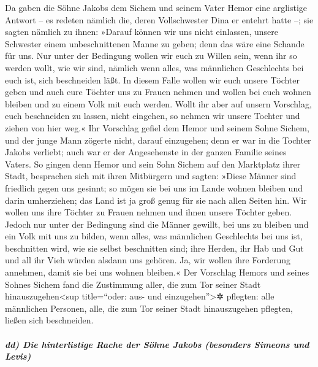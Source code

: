  Da gaben die Söhne Jakobs dem Sichem und seinem Vater
Hemor eine arglistige Antwort -- es redeten nämlich die, deren
Vollschwester Dina er entehrt hatte --;  sie sagten
nämlich zu ihnen: »Darauf können wir uns nicht einlassen, unsere
Schwester einem unbeschnittenen Manne zu geben; denn das wäre eine
Schande für uns.  Nur unter der Bedingung wollen wir euch
zu Willen sein, wenn ihr so werden wollt, wie wir sind, nämlich wenn
alles, was männlichen Geschlechts bei euch ist, sich beschneiden läßt.
 In diesem Falle wollen wir euch unsere Töchter geben und
auch eure Töchter uns zu Frauen nehmen und wollen bei euch wohnen
bleiben und zu einem Volk mit euch werden.  Wollt ihr
aber auf unsern Vorschlag, euch beschneiden zu lassen, nicht eingehen,
so nehmen wir unsere Tochter und ziehen von hier weg.« 
Ihr Vorschlag gefiel dem Hemor und seinem Sohne Sichem, 
und der junge Mann zögerte nicht, darauf einzugehen; denn er war in die
Tochter Jakobs verliebt; auch war er der Angesehenste in der ganzen
Familie seines Vaters.  So gingen denn Hemor und sein
Sohn Sichem auf den Marktplatz ihrer Stadt, besprachen sich mit ihren
Mitbürgern und sagten:  »Diese Männer sind friedlich
gegen uns gesinnt; so mögen sie bei uns im Lande wohnen bleiben und
darin umherziehen; das Land ist ja groß genug für sie nach allen Seiten
hin. Wir wollen uns ihre Töchter zu Frauen nehmen und ihnen unsere
Töchter geben.  Jedoch nur unter der Bedingung sind die
Männer gewillt, bei uns zu bleiben und ein Volk mit uns zu bilden, wenn
alles, was männlichen Geschlechts bei uns ist, beschnitten wird, wie sie
selbst beschnitten sind;  ihre Herden, ihr Hab und Gut
und all ihr Vieh würden alsdann uns gehören. Ja, wir wollen ihre
Forderung annehmen, damit sie bei uns wohnen bleiben.« 
Der Vorschlag Hemors und seines Sohnes Sichem fand die Zustimmung aller,
die zum Tor seiner Stadt hinauszugehen\textless sup title=``oder: aus-
und einzugehen''\textgreater✲ pflegten: alle männlichen Personen, alle,
die zum Tor seiner Stadt hinauszugehen pflegten, ließen sich
beschneiden.

\hypertarget{dd-die-hinterlistige-rache-der-suxf6hne-jakobs-besonders-simeons-und-levis}{%
\subparagraph{dd) Die hinterlistige Rache der Söhne Jakobs (besonders
Simeons und
Levis)}\label{dd-die-hinterlistige-rache-der-suxf6hne-jakobs-besonders-simeons-und-levis}}

